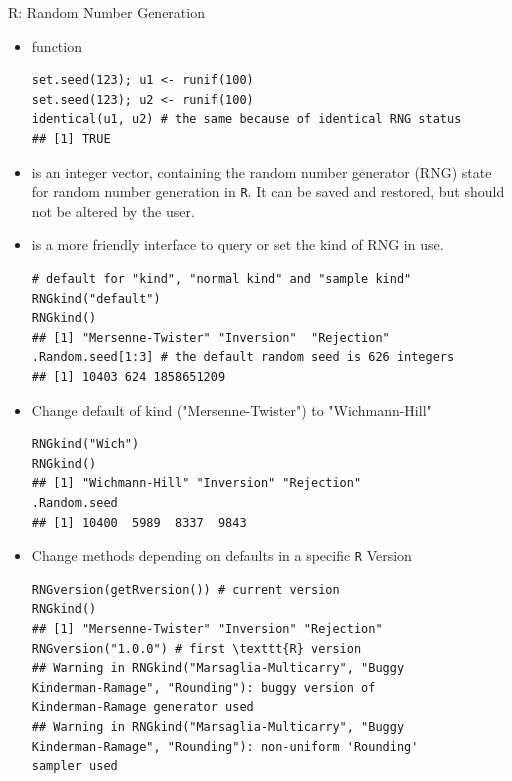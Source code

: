 \documentclass[11pt,compress,t,notes=noshow, xcolor=table]{beamer}
\begin{document}
\begin{vbframe}{R: Random Number Generation}
\begin{itemize}
\item {} function

\footnotesize
\begin{verbatim}
set.seed(123); u1 <- runif(100)
set.seed(123); u2 <- runif(100) 
identical(u1, u2) # the same because of identical RNG status
## [1] TRUE
\end{verbatim}


\normalsize
\item {} is an integer vector, containing the random number generator (RNG) state for random number generation in \texttt{R}. It can be saved and restored, but should not be altered by the user.

\item {} is a more friendly interface to query or set the kind of RNG in use.
\footnotesize

\begin{verbatim}
# default for "kind", "normal kind" and "sample kind" 
RNGkind("default") 
RNGkind()
## [1] "Mersenne-Twister" "Inversion"  "Rejection"
.Random.seed[1:3] # the default random seed is 626 integers
## [1] 10403 624 1858651209
\end{verbatim}


\normalsize
\framebreak
\item Change default of kind ("Mersenne-Twister") to "Wichmann-Hill"

\footnotesize
\begin{verbatim}
RNGkind("Wich")
RNGkind()
## [1] "Wichmann-Hill" "Inversion" "Rejection"
.Random.seed
## [1] 10400  5989  8337  9843
\end{verbatim}


\normalsize
\item Change methods depending on defaults in a specific \texttt{R} Version

\footnotesize
\begin{verbatim}
RNGversion(getRversion()) # current version
RNGkind()
## [1] "Mersenne-Twister" "Inversion" "Rejection"
RNGversion("1.0.0") # first \texttt{R} version
## Warning in RNGkind("Marsaglia-Multicarry", "Buggy
Kinderman-Ramage", "Rounding"): buggy version of 
Kinderman-Ramage generator used
## Warning in RNGkind("Marsaglia-Multicarry", "Buggy
Kinderman-Ramage", "Rounding"): non-uniform 'Rounding' 
sampler used
\end{verbatim}


\end{itemize}
\end{vbframe}
\end{document}
